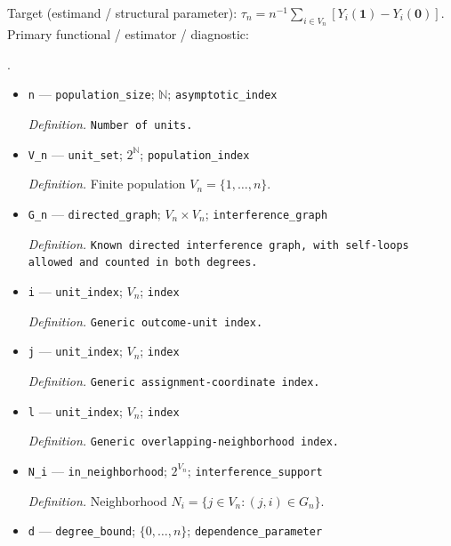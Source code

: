 \documentclass{article}
\begin{document}
Target (estimand / structural parameter): \(\tau_n=n^{-1}\sum_{i\in V_n}[Y_i(\mathbf1)-Y_i(\mathbf0)]\).
Primary functional / estimator / diagnostic: \par\noindent {}\par\noindent.
\begin{itemize}
  \item \texttt{n} --- \texttt{population\_\allowbreak{}size}; \(\mathbb N\); \texttt{asymptotic\_\allowbreak{}index}
  \par\smallskip\noindent\emph{Definition.} \texttt{Number of units.}
  \item \texttt{V\_\allowbreak{}n} --- \texttt{unit\_\allowbreak{}set}; \(2^{\mathbb N}\); \texttt{population\_\allowbreak{}index}
  \par\smallskip\noindent\emph{Definition.} Finite population \(V_n=\{1,\ldots,n\}\).
  \item \texttt{G\_\allowbreak{}n} --- \texttt{directed\_\allowbreak{}graph}; \(V_n\times V_n\); \texttt{interference\_\allowbreak{}graph}
  \par\smallskip\noindent\emph{Definition.} \texttt{Known directed interference graph,\allowbreak{} with self-\allowbreak{}loops allowed and counted in both degrees.}
  \item \texttt{i} --- \texttt{unit\_\allowbreak{}index}; \(V_n\); \texttt{index}
  \par\smallskip\noindent\emph{Definition.} \texttt{Generic outcome-\allowbreak{}unit index.}
  \item \texttt{j} --- \texttt{unit\_\allowbreak{}index}; \(V_n\); \texttt{index}
  \par\smallskip\noindent\emph{Definition.} \texttt{Generic assignment-\allowbreak{}coordinate index.}
  \item \texttt{l} --- \texttt{unit\_\allowbreak{}index}; \(V_n\); \texttt{index}
  \par\smallskip\noindent\emph{Definition.} \texttt{Generic overlapping-\allowbreak{}neighborhood index.}
  \item \texttt{N\_\allowbreak{}i} --- \texttt{in\_\allowbreak{}neighborhood}; \(2^{V_n}\); \texttt{interference\_\allowbreak{}support}
  \par\smallskip\noindent\emph{Definition.} Neighborhood \(N_i=\{j\in V_n:(j,i)\in G_n\}\).
  \item \texttt{d} --- \texttt{degree\_\allowbreak{}bound}; \(\{0,\ldots,n\}\); \texttt{dependence\_\allowbreak{}parameter}

\end{itemize}
\end{document}
